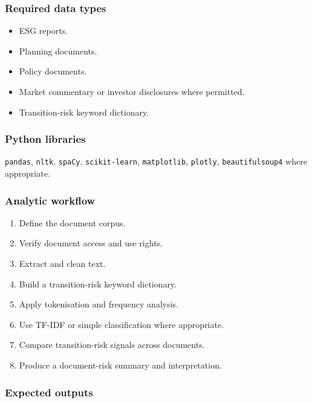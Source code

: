 \documentclass[
  a4paper,
]{article}
\providecommand{\tightlist}{%
  \setlength{\itemsep}{0pt}\setlength{\parskip}{0pt}}
\begin{document}
\subsubsection{Required data types}\label{required-data-types-3}

\begin{itemize}
\tightlist
\item
  ESG reports.
\item
  Planning documents.
\item
  Policy documents.
\item
  Market commentary or investor disclosures where permitted.
\item
  Transition-risk keyword dictionary.
\end{itemize}

\subsubsection{Python libraries}\label{python-libraries-3}

\texttt{pandas}, \texttt{nltk}, \texttt{spaCy}, \texttt{scikit-learn},
\texttt{matplotlib}, \texttt{plotly}, \texttt{beautifulsoup4} where
appropriate.

\subsubsection{Analytic workflow}\label{analytic-workflow-3}

\begin{enumerate}
\def\labelenumi{\arabic{enumi}.}
\tightlist
\item
  Define the document corpus.
\item
  Verify document access and use rights.
\item
  Extract and clean text.
\item
  Build a transition-risk keyword dictionary.
\item
  Apply tokenisation and frequency analysis.
\item
  Use TF-IDF or simple classification where appropriate.
\item
  Compare transition-risk signals across documents.
\item
  Produce a document-risk summary and interpretation.
\end{enumerate}

\subsubsection{Expected outputs}\label{expected-outputs-3}
\end{document}
